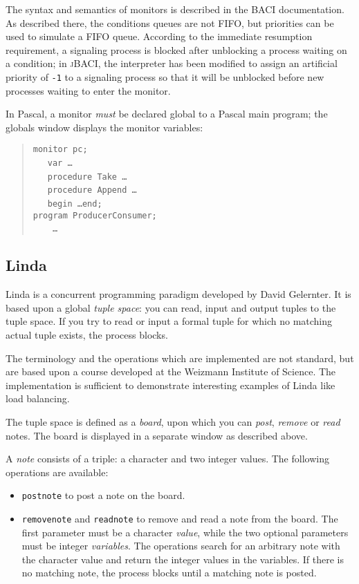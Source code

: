 \documentclass[11pt]{article}
\newcommand{\jb}{\textsc{\sffamily jBACI}}
\newcommand{\baci}{\textsc{\sffamily BACI}}
\newcommand{\p}[1]{\texttt{#1}}
\begin{document}
The syntax and semantics of monitors is described in the \baci{} documentation.
As described there, the conditions queues are not FIFO, but priorities can
be used to simulate a FIFO queue.
According to the immediate resumption requirement,
a signaling process is blocked after unblocking a process waiting on a condition;
in \jb{}, the interpreter has been modified to assign an artificial
priority of \p{-1} to a signaling process so that it will be unblocked
before new processes waiting to enter the monitor.

In Pascal, a monitor \emph{must} be declared global to a Pascal main program;
the globals window displays the monitor variables:
\begin{quote}
\p{monitor pc;}\\
\ \ \ \p{var \ldots }\\
\ \ \ \p{procedure Take \ldots }\\
\ \ \ \p{procedure Append \ldots }\\
\ \ \ \p{begin \ldots end;}\\
\p{program ProducerConsumer;}\\
\ \ \ \p{ \ldots }\\
\end{quote}

\subsection{Linda}

Linda is a concurrent programming paradigm developed by David Gelernter.
It is based upon a global \emph{tuple space}: you can read, input and
output tuples to the tuple space.
If you try to read or input a formal tuple for which no matching actual tuple exists,
the process blocks.

The terminology and the operations which are implemented are not standard,
but are based upon a course developed at the Weizmann Institute of Science.
The implementation is sufficient to demonstrate interesting examples of
Linda like load balancing.

The tuple space is defined as a \emph{board},
upon which you can \emph{post}, \emph{remove} or \emph{read} notes.
The board is displayed in a separate window as described above.

A \emph{note} consists of a triple:
a character and two integer values.
The following operations are available:
\begin{itemize}
\item \p{postnote} to post a note on the board.
\item \p{removenote} and \p{readnote} to remove and read a note from the board.
The first parameter must be a character \emph{value}, while the two optional parameters
must be integer \emph{variables}.
The operations search for an arbitrary note with the character value
and return the integer values in the variables.
If there is no matching note, the process blocks until a matching note is posted.
\end{itemize}
\end{document}
